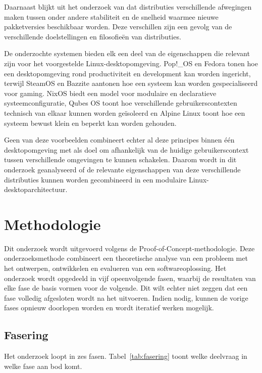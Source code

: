 \documentclass{hogent-article}
\begin{document}
Daarnaast blijkt uit het onderzoek van \textcite{Legay2020} dat distributies verschillende afwegingen maken tussen onder andere stabiliteit en de snelheid waarmee nieuwe pakketversies beschikbaar worden. Deze verschillen zijn een gevolg van de verschillende doelstellingen en filosofieën van distributies.

De onderzochte systemen bieden elk een deel van de eigenschappen die relevant zijn voor het voorgestelde Linux-desktopomgeving. Pop!\_OS en Fedora tonen hoe een desktopomgeving rond productiviteit en development kan worden ingericht, terwijl SteamOS en Bazzite aantonen hoe een systeem kan worden gespecialiseerd voor gaming. NixOS biedt een model voor modulaire en declaratieve systeemconfiguratie, Qubes OS toont hoe verschillende gebruikerscontexten technisch van elkaar kunnen worden geïsoleerd en Alpine Linux toont hoe een systeem bewust klein en beperkt kan worden gehouden.

Geen van deze voorbeelden combineert echter al deze principes binnen één desktopomgeving met als doel om afhankelijk van de huidige gebruikerscontext tussen verschillende omgevingen te kunnen schakelen. Daarom wordt in dit onderzoek geanalyseerd of de relevante eigenschappen van deze verschillende distributies kunnen worden gecombineerd in een modulaire Linux-desktoparchitectuur.

\section{Methodologie}
\label{sec:methodologie}

Dit onderzoek wordt uitgevoerd volgens de Proof-of-Concept-methodologie. Deze onderzoeksmethode combineert een theoretische analyse van een probleem met het ontwerpen, ontwikkelen en evalueren van een softwareoplossing. Het onderzoek wordt opgedeeld in vijf opeenvolgende fasen, waarbij de resultaten van elke fase de basis vormen voor de volgende. Dit wilt echter niet zeggen dat een fase volledig afgesloten wordt na het uitvoeren. Indien nodig, kunnen de vorige fases opnieuw doorlopen worden en wordt iteratief werken mogelijk.

\subsection{Fasering}
\label{ssec:fasering}

Het onderzoek loopt in zes fasen. Tabel~\ref{tab:fasering} toont welke deelvraag
in welke fase aan bod komt.
\end{document}
